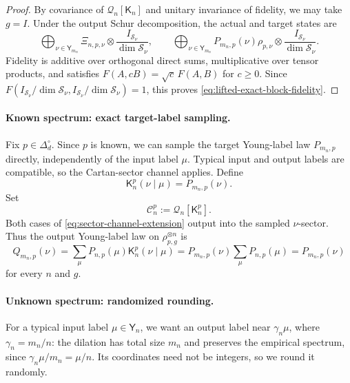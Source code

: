 \documentclass[11pt]{article}
\theoremstyle{remark}
\theoremstyle{plain}
\newcommand{\cC}{\mathcal C}
\newcommand{\cS}{\mathcal S}
\newcommand{\ot}{\otimes}
\begin{document}
\begin{proof}
By covariance of \(\mathcal Q_n[\mathsf K_n]\) and unitary invariance of fidelity,
we may take \(g=I\).  Under the output Schur decomposition, the actual and
target states are
\[
 \bigoplus_{\nu\in\mathsf Y_{m_n}}
 \Xi_{n,p,\nu}\ot\frac{I_{\cS_\nu}}{\dim\cS_\nu},
 \qquad
 \bigoplus_{\nu\in\mathsf Y_{m_n}}
 P_{m_n,p}(\nu)\rho_{p,\nu}
 \ot\frac{I_{\cS_\nu}}{\dim\cS_\nu}.
\]
Fidelity is additive over orthogonal direct sums, multiplicative over
tensor products, and satisfies \(F(A,cB)=\sqrt c\,F(A,B)\) for \(c\ge0\).
Since \(F(I_{\cS_\nu}/\dim\cS_\nu,I_{\cS_\nu}/\dim\cS_\nu)=1\), this proves
\eqref{eq:lifted-exact-block-fidelity}.
\end{proof}

\paragraph{Known spectrum: exact target-label sampling.}

Fix \(p\in\Delta_d^\circ\).  Since \(p\) is known, we can sample the target
Young-label law \(P_{m_n,p}\) directly, independently of the input label
\(\mu\).  Typical input and output labels are compatible, so the
Cartan-sector channel applies.
Define
\begin{equation}\label{eq:known-target-label-kernel}
  \mathsf K_n^p(\nu\mid\mu)=P_{m_n,p}(\nu).
\end{equation}
Set
\begin{equation}\label{eq:known-cloner-definition}
  \cC_n^p:=\mathcal Q_n[\mathsf K_n^p].
\end{equation}
Both cases of \eqref{eq:sector-channel-extension} output into the sampled
\(\nu\)-sector.  Thus the output Young-label law on
\(\rho_{p,g}^{\ot n}\) is
\[
  Q_{m_n,p}(\nu)
  =\sum_\mu P_{n,p}(\mu)\mathsf K_n^p(\nu\mid\mu)
  =P_{m_n,p}(\nu)\sum_\mu P_{n,p}(\mu)
  =P_{m_n,p}(\nu)
\]
for every \(n\) and \(g\).

\paragraph{Unknown spectrum: randomized rounding.}

For a typical input label \(\mu\in\mathsf Y_n\), we want an output label
near \(\gamma_n\mu\), where \(\gamma_n=m_n/n\): the dilation has total size
\(m_n\) and preserves the empirical spectrum, since
\(\gamma_n\mu/m_n=\mu/n\).  Its coordinates need not be integers, so we
round it randomly.
\end{document}
